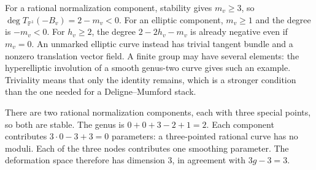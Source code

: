 For a rational normalization component, stability gives $m_v\geq3$,
so $\deg T_{\mathbb P^1}(-B_v)=2-m_v<0$.
For an elliptic component, $m_v\geq1$ and the degree is $-m_v<0$.
For $h_v\geq2$, the degree $2-2h_v-m_v$ is already negative
even if $m_v=0$. An unmarked elliptic curve instead has trivial
tangent bundle and a nonzero translation vector field. A finite
group may have several elements: the hyperelliptic involution of
a smooth genus-two curve gives such an example. Triviality means
that only the identity remains, which is a stronger condition
than the one needed for a Deligne--Mumford stack.

There are two rational normalization components, each with three
special points, so both are stable. The genus is
$0+0+3-2+1=2$. Each component contributes
$3\cdot0-3+3=0$ parameters: a three-pointed rational curve has
no moduli. Each of the three nodes contributes one smoothing
parameter. The deformation space therefore has dimension $3$,
in agreement with $3g-3=3$.
